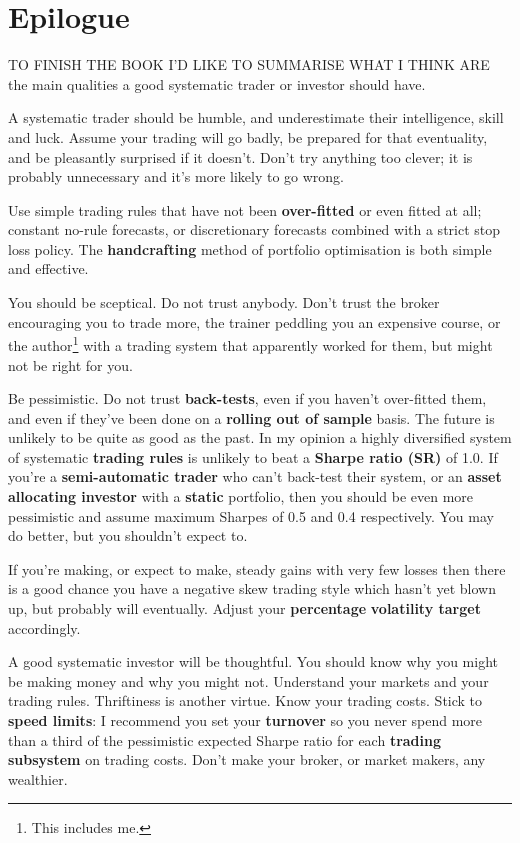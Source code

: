 \chapter*{Epilogue}  {} 

TO FINISH THE BOOK I'D LIKE TO SUMMARISE WHAT I THINK ARE the main qualities a good systematic trader or investor should have.

A systematic trader should be humble, and underestimate their intelligence, skill and luck. Assume your trading will go badly, be prepared for that eventuality, and be pleasantly surprised if it doesn't. Don't try anything too clever; it is probably unnecessary and it's more likely to go wrong.

Use simple trading rules that have not been \textbf{over-fitted} or even fitted at all; constant no-rule forecasts, or discretionary forecasts combined with a strict stop loss policy. The \textbf{handcrafting} method of portfolio optimisation is both simple and effective.

You should be sceptical. Do not trust anybody. Don't trust the broker encouraging you to trade more, the trainer peddling you an expensive course, or the author\footnote{This includes me.} with a trading system that apparently worked for them, but might not be right for you.

Be pessimistic. Do not trust \textbf{back-tests}, even if you haven't over-fitted them, and even if they've been done on a \textbf{rolling out of sample} basis. The future is unlikely to be quite as good as the past. In my opinion a highly diversified system of systematic \textbf{trading rules} is unlikely to beat a \textbf{Sharpe ratio (SR)} of 1.0. If you're a \textbf{semi-automatic trader} who can't back-test their system, or an \textbf{asset allocating investor} with a \textbf{static} portfolio, then you should be even more pessimistic and assume maximum Sharpes of 0.5 and 0.4 respectively. You may do better, but you shouldn't expect to.

If you're making, or expect to make, steady gains with very few losses then there is a good chance you have a negative skew trading style which hasn't yet blown up, but probably will eventually. Adjust your \textbf{percentage} \textbf{volatility target} accordingly.

A good systematic investor will be thoughtful. You should know why you might be making money and why you might not. Understand your markets and your trading rules.
Thriftiness is another virtue. Know your trading costs. Stick to \textbf{speed limits}: I recommend you set your \textbf{turnover} so you never spend more than a third of the pessimistic expected Sharpe ratio for each \textbf{trading subsystem} on trading costs. Don't make your broker, or market makers, any wealthier.

